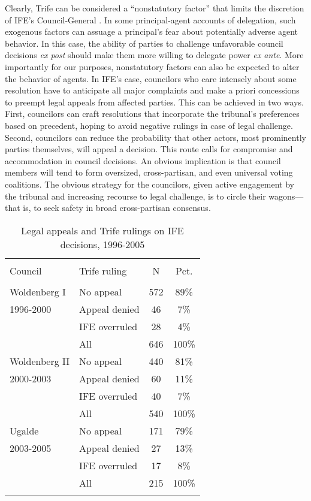 \documentclass[12 pt]{article}
\begin{document}
Clearly, {\sc Trife} can be considered a ``nonstatutory factor'' that limits the discretion of IFE's Council-General \citep{Huber2002}.  In some principal-agent accounts of delegation, such exogenous factors can assuage a principal's fear about potentially adverse agent behavior.  In this case, the ability of parties to challenge unfavorable council decisions \emph{ex post} should make them more willing to delegate power \emph{ex ante}.  More importantly for our purposes, nonstatutory factors can also be expected to alter the behavior of agents.  In IFE's case, councilors who care intensely about some resolution have to anticipate all major complaints and make a priori concessions to preempt legal appeals from affected parties.  This can be achieved in two ways.  First, councilors can craft resolutions that incorporate the tribunal's preferences based on precedent, hoping to avoid negative rulings in case of legal challenge.  Second, councilors can reduce the probability that other actors, most prominently parties themselves, will appeal a decision.  This route calls for compromise and accommodation in council decisions.  An obvious implication is that council members will tend to form oversized, cross-partisan, and even universal voting coalitions.  The obvious strategy for the councilors, given active engagement by the tribunal and increasing recourse to legal challenge, is to circle their wagons---that is, to seek safety in broad cross-partisan consensus.


\begin{table}
\caption{Legal appeals and {\sc Trife} rulings on IFE decisions, 1996-2005}\label{T:rulings}
\begin{center}
\begin{tabular}{llcc}
\hline\\ [-1.5ex]
Council & {\sc Trife} ruling &  N  & Pct. \\
\hline \\ [-1ex]
Woldenberg I & No appeal  & 572 &  89\% \\
1996-2000 & Appeal denied &  46 &   7\% \\
          & IFE overruled &  28 &   4\% \\
          & All           & 646 & 100\% \\ [1.2ex]
Woldenberg II & No appeal & 440 &  81\% \\
2000-2003 & Appeal denied &  60 &  11\% \\
          & IFE overruled &  40 &   7\% \\
          & All           & 540 & 100\% \\ [1.2ex]
Ugalde    & No appeal     & 171 &  79\% \\
2003-2005 & Appeal denied &  27 &  13\% \\
          & IFE overruled &  17 &   8\% \\
          & All           & 215 & 100\% \\
\hline \\
\end{tabular}
\end{center}
\end{table}
\end{document}
